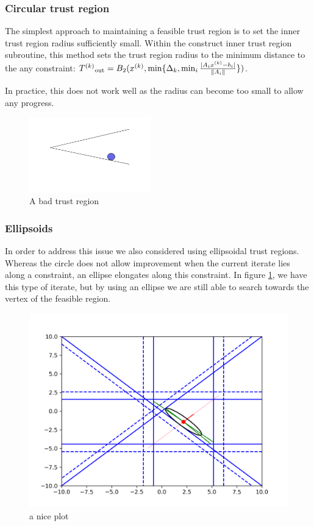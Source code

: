 \subsubsection{Circular trust region}
The simplest approach to maintaining a feasible trust region is to set the inner trust region radius sufficiently small.
Within the construct inner trust region subroutine, this method sets the trust region radius to the minimum distance to the any constraint:
${T^{(k)}}_{\text{out}} = B_2({x}^{(k)}, \min\{\Delta_k, \min_{i}\frac{|A_i{x}^{(k)} - b_i|}{\|A_i\|} \})$.

In practice, this does not work well as the radius can become too small to allow any progress.

\begin{figure}[h]
    \centering
    \includegraphics[width=200px]{images/BAD_CIRCLE.png}
    \caption{A bad trust region}
\end{figure}


    
\subsubsection{Ellipsoids}

In order to address this issue we also considered using ellipsoidal trust regions.
Whereas the circle does not allow improvement when the current iterate lies along a constraint, an ellipse elongates along this constraint.
In figure \ref{ellipse_adv}, we have this type of iterate, but by using an ellipse we are still able to search towards the vertex of the feasible region.
\begin{figure}[h]
    \centering
    \includegraphics[scale=0.4]{images/advantage_of_ellipse_2.png}
    \caption{a nice plot}
    \label{ellipse_adv}
\end{figure}



